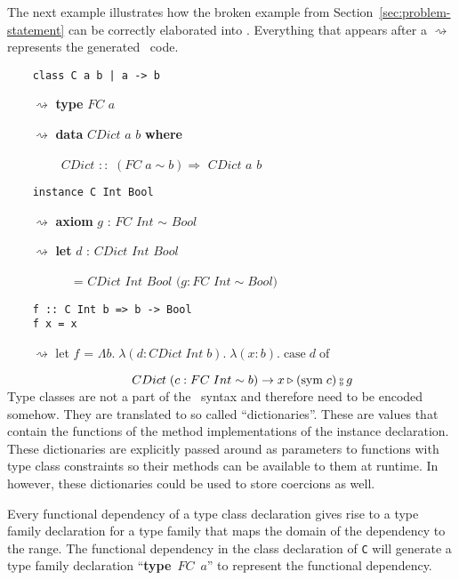 The next example illustrates how the broken example from
Section~\ref{sec:problem-statement} can be correctly elaborated into \systemfc.
Everything that appears after a $\rightsquigarrow$ represents the
generated \systemfc~code.

\begin{verbatim}
    class C a b | a -> b
\end{verbatim}

$\qquad\rightsquigarrow$ \textbf{type} $FC$ $a$

$\qquad\rightsquigarrow$ \textbf{data} $CDict$ $a$ $b$ \textbf{where}

$\qquad\qquad$ $CDict$ $::$ $(FC \; a \sim b)
\Rightarrow$ $CDict$ $a$ $b$

\begin{verbatim}
    instance C Int Bool
\end{verbatim}

$\qquad\rightsquigarrow$ \textbf{axiom} $g$ : $FC$ $Int$ $\sim$ $Bool$

$\qquad\rightsquigarrow$ \textbf{let} $d$ : $CDict$ $Int$ $Bool$

$\qquad\qquad\quad$ = $CDict$ $Int$ $Bool$ $(g : FC$ $Int \sim Bool)$

\begin{verbatim}
    f :: C Int b => b -> Bool
    f x = x
\end{verbatim}

$\qquad\rightsquigarrow$ let $f$ = $\Lambda b. \; \lambda (d : CDict \; Int \;
b). \;\lambda (x : b). \; \text{case} \; d \; \text{of}$

$\hspace{3.5cm} CDict \; (c : FC \; Int \sim b ) \rightarrow x \triangleright
(\text{sym} \; c) \fctrans g$
\\

Type classes are not a part of the \systemfc~syntax and therefore need to be
encoded somehow. They are translated to so called ``dictionaries''.  These are
values that contain the functions of the method implementations of the instance
declaration. These dictionaries are explicitly passed around as parameters to
functions with type class constraints so their methods can be available to them
at runtime. In \systemfc however, these dictionaries could be used to store
coercions as well.

Every functional dependency of a type class declaration gives rise to a type
family declaration for a type family that maps the domain of the dependency to
the range.  The functional dependency in the class declaration of \texttt{C}
will generate a type family declaration ``\textbf{type}~$FC$~$a$'' to represent
the functional dependency.

